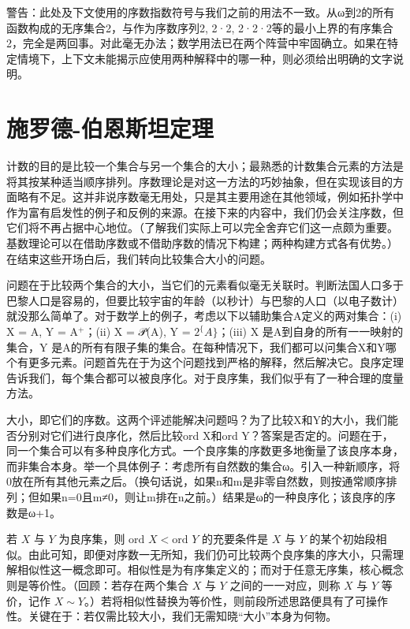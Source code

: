 \documentclass[12pt,a4paper]{ctexbook}
\theoremstyle{definition}
\theoremstyle{remark}
\begin{document}
{警告：此处及下文使用的序数指数符号与我们之前的用法不一致。从ω到2的所有函数构成的无序集合2，与作为序数序列2, 2·2, 2·2·2等的最小上界的有序集合2，完全是两回事。对此毫无办法；数学用法已在两个阵营中牢固确立。如果在特定情境下，上下文未能揭示应使用两种解释中的哪一种，则必须给出明确的文字说明。


\chapter{施罗德-伯恩斯坦定理}

计数的目的是比较一个集合与另一个集合的大小；最熟悉的计数集合元素的方法是将其按某种适当顺序排列。序数理论是对这一方法的巧妙抽象，但在实现该目的方面略有不足。这并非说序数毫无用处，只是其主要用途在其他领域，例如拓扑学中作为富有启发性的例子和反例的来源。在接下来的内容中，我们仍会关注序数，但它们将不再占据中心地位。（了解我们实际上可以完全舍弃它们这一点颇为重要。基数理论可以在借助序数或不借助序数的情况下构建；两种构建方式各有优势。）在结束这些开场白后，我们转向比较集合大小的问题。

问题在于比较两个集合的大小，当它们的元素看似毫无关联时。判断法国人口多于巴黎人口是容易的，但要比较宇宙的年龄（以秒计）与巴黎的人口（以电子数计）就没那么简单了。对于数学上的例子，考虑以下以辅助集合A定义的两对集合：(i) X = A, Y = A$^{+}$；(ii) X = 𝒫(A), Y = $2^\{A\}$；(iii) X 是A到自身的所有一一映射的集合，Y 是A的所有有限子集的集合。在每种情况下，我们都可以问集合X和Y哪个有更多元素。问题首先在于为这个问题找到严格的解释，然后解决它。良序定理告诉我们，每个集合都可以被良序化。对于良序集，我们似乎有了一种合理的度量方法。

大小，即它们的序数。这两个评述能解决问题吗？为了比较X和Y的大小，我们能否分别对它们进行良序化，然后比较ord X和ord Y？答案是否定的。问题在于，同一个集合可以有多种良序化方式。一个良序集的序数更多地衡量了该良序本身，而非集合本身。举一个具体例子：考虑所有自然数的集合ω。引入一种新顺序，将0放在所有其他元素之后。（换句话说，如果n和m是非零自然数，则按通常顺序排列；但如果n=0且m≠0，则让m排在n之前。）结果是ω的一种良序化；该良序的序数是ω+1。

若 \(X\) 与 \(Y\) 为良序集，则 \(\text{ord } X < \text{ord } Y\) 的充要条件是 \(X\) 与 \(Y\) 的某个初始段相似。由此可知，即便对序数一无所知，我们仍可比较两个良序集的序大小，只需理解相似性这一概念即可。相似性是为有序集定义的；而对于任意无序集，核心概念则是等价性。（回顾：若存在两个集合 \(X\) 与 \(Y\) 之间的一一对应，则称 \(X\) 与 \(Y\) 等价，记作 \(X \sim Y\)。）若将相似性替换为等价性，则前段所述思路便具有了可操作性。关键在于：若仅需比较大小，我们无需知晓“大小”本身为何物。

}
\end{document}
